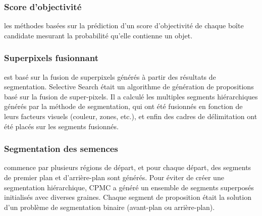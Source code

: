      \subsubsection{Score d'objectivité} les méthodes basées sur la prédiction d'un score d'objectivité de chaque boîte candidate mesurant la probabilité qu'elle contienne un objet.
     \subsubsection{Superpixels fusionnant} est basé sur la fusion de superpixels générés à partir des résultats de segmentation. Selective Search \cite{selctive_search_paper} était un algorithme de génération de propositions basé sur la fusion de super-pixels. Il a calculé les multiples segments hiérarchiques générés par la méthode de segmentation, qui ont été fusionnés en fonction de leurs facteurs visuels (couleur, zones, etc.), et enfin des cadres de délimitation ont été placés sur les segments fusionnés.
     \subsubsection{Segmentation des semences} commence par plusieurs régions de départ, et pour chaque départ, des segments de premier plan et d'arrière-plan sont générés. Pour éviter de créer une segmentation hiérarchique, CPMC \cite{cpmc_paper} a généré un ensemble de segments superposés initialisés avec diverses graines. Chaque segment de proposition était la solution d'un problème de segmentation binaire (avant-plan ou arrière-plan).

